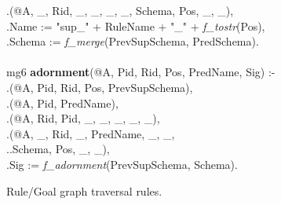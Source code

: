 \documentclass{sigmod08}
\newcommand{\datalogspace}{\textcolor[gray]{1}{.}\hspace{0.5in}}
\begin{document}
\begin{figure}[t]
\begin{boxedminipage}{\linewidth}
{\datalogspace {\small \bf predicate}(@A, \_, Rid, \_, \_, \_, \_, Schema, Pos, \_, \_),\\
\datalogspace Name := "sup\_" + RuleName + "\_" + {\em f\_tostr}(Pos),\\
\datalogspace Schema := {\em f\_merge}(PrevSupSchema, PredSchema).\\
\\
mg6 {\small \bf adornment}(@A, Pid, Rid, Pos, PredName, Sig) :- \\
\datalogspace {\small \bf supNext}(@A, Pid, Rid, Pos, PrevSupSchema),\\
\datalogspace {\small \bf idbPredicate}(@A, Pid, PredName), \\
\datalogspace {\small \bf rule}(@A, Rid, Pid, \_, \_, \_, \_, \_),\\
\datalogspace {\small \bf predicate}(@A, \_, Rid, \_, PredName, \_, \_, \\
\datalogspace \datalogspace Schema, Pos, \_, \_),\\ 
\datalogspace Sig := {\em f\_adornment}(PrevSupSchema, Schema).
}
\caption{\label{fig:magicRules}Rule/Goal graph traversal rules.}
\end{boxedminipage}
\end{figure}
\end{document}
